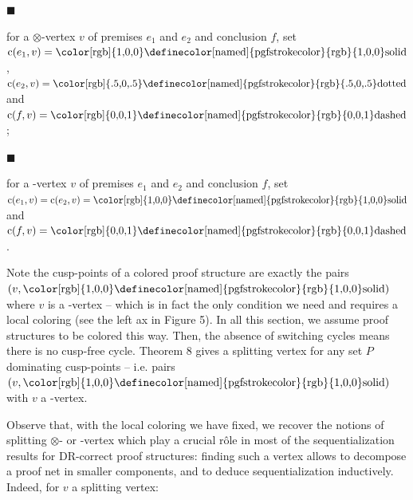  
 
\par\noindent  $\blacksquare$ 
 
for a $\otimes$-vertex $v$ of premises $e_{1}$ and $e_{2}$ and conclusion $f$, set $\textnormal{{c}}(e_{1},v)=\text{{\color[rgb]{1,0,0}\definecolor[named]{%
pgfstrokecolor}{rgb}{1,0,0}solid}}$, $\textnormal{{c}}(e_{2},v)=\text{{\color[rgb]{.5,0,.5}\definecolor[named]{%
pgfstrokecolor}{rgb}{.5,0,.5}dotted}}$ and $\textnormal{{c}}(f,v)=\text{{\color[rgb]{0,0,1}\definecolor[named]{%
pgfstrokecolor}{rgb}{0,0,1}dashed}}$;\par
 
 
 
\par\noindent  $\blacksquare$ 
 
for a -vertex $v$ of premises $e_{1}$ and $e_{2}$ and conclusion $f$, set $\textnormal{{c}}(e_{1},v)=\textnormal{{c}}(e_{2},v)=\text{{\color[rgb]{1,0,0}%
\definecolor[named]{pgfstrokecolor}{rgb}{1,0,0}solid}}$ and $\textnormal{{c}}(f,v)=\text{{\color[rgb]{0,0,1}\definecolor[named]{%
pgfstrokecolor}{rgb}{0,0,1}dashed}}$.\par
 
 
  
Note the cusp-points of a colored proof structure are exactly the pairs $(v,\text{{\color[rgb]{1,0,0}\definecolor[named]{pgfstrokecolor}{rgb}{1,0,0}%
solid}})$ where $v$ is a -vertex – which is in fact the only condition we need and requires a local coloring (see the left ax in Figure 5). In all this section, we assume proof structures to be colored this way. Then, the absence of switching cycles means there is no cusp-free cycle. Theorem 8 gives a splitting vertex for any set $P$ dominating cusp-points – i.e. pairs $(v,\text{{\color[rgb]{1,0,0}\definecolor[named]{pgfstrokecolor}{rgb}{1,0,0}%
solid}})$ with $v$ a -vertex.\par
 
 
 
Observe that, with the local coloring we have fixed, we recover the notions of splitting $\otimes$- or -vertex which play a crucial rôle in most of the sequentialization results for DR-correct proof structures: finding such a vertex allows to decompose a proof net in smaller components, and to deduce sequentialization inductively. Indeed, for $v$ a splitting vertex:\par
  
